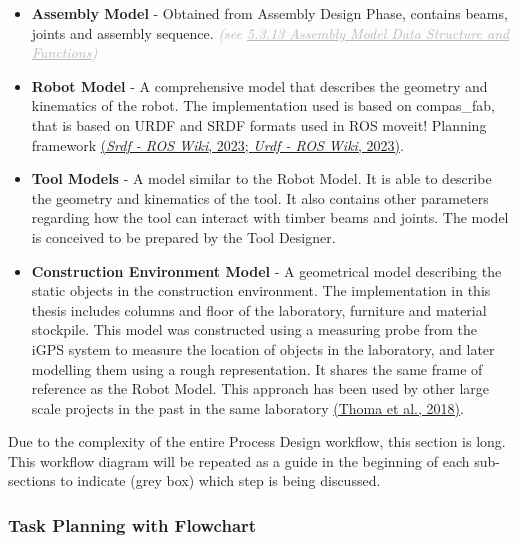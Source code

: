 \begin{itemize}
	\item \textbf{Assembly Model} - Obtained from Assembly Design Phase, contains beams, joints and assembly sequence. \textit{\textcolor[HTML]{B7B7B7}{(see \uline{5.3.13 Assembly Model Data Structure and Functions})}}

	\item \textbf{Robot Model} - A comprehensive model that describes the geometry and kinematics of the robot. The implementation used is based on compas\_fab, that is based on URDF and SRDF formats used in ROS moveit! Planning framework \href{https://www.zotero.org/google-docs/?9FxuyJ}{(}\href{https://www.zotero.org/google-docs/?9FxuyJ}{\textit{Srdf - ROS Wiki}\href{https://www.zotero.org/google-docs/?9FxuyJ}{}, 2023; }\href{https://www.zotero.org/google-docs/?9FxuyJ}{\textit{Urdf - ROS Wiki}\href{https://www.zotero.org/google-docs/?9FxuyJ}{}, 2023)}.

	\item \textbf{Tool Models }- A model similar to the Robot Model. It is able to describe the geometry and kinematics of the tool. It also contains other parameters regarding how the tool can interact with timber beams and joints. The model is conceived to be prepared by the Tool Designer.

	\item \textbf{Construction Environment Model} - A geometrical model describing the static objects in the construction environment. The implementation in this thesis includes columns and floor of the laboratory, furniture and material stockpile. This model was constructed using a measuring probe from the iGPS system to measure the location of objects in the laboratory, and later modelling them using a rough representation. It shares the same frame of reference as the Robot Model. This approach has been used by other large scale projects in the past in the same laboratory \href{https://www.zotero.org/google-docs/?qIPEJd}{(Thoma et al., 2018)}.

\end{itemize}
Due to the complexity of the entire Process Design workflow, this section is long. This workflow diagram will be repeated as a guide in the beginning of each sub-sections to indicate (grey box) which step is being discussed.

\subsubsection{Task Planning with Flowchart}

